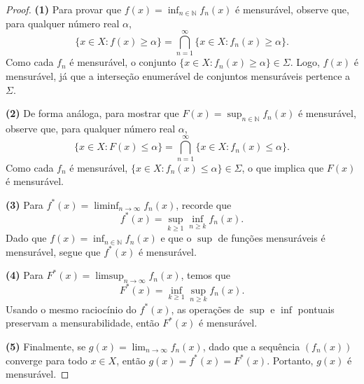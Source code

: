 \begin{proof}
    \textbf{(1)} Para provar que $ f(x) = \inf_{n \in \mathbb{N}} f_n(x) $ é mensurável, observe que, para qualquer número real $\alpha$,
    \begin{equation*}
    \{ x \in X : f(x) \geq \alpha \} = \bigcap_{n=1}^{\infty} \{ x \in X : f_n(x) \geq \alpha \}.
    \end{equation*}
    Como cada $ f_n $ é mensurável, o conjunto $ \{ x \in X : f_n(x) \geq \alpha \} \in \Sigma $. Logo, $ f(x) $ é mensurável, já que a interseção enumerável de conjuntos mensuráveis pertence a $\Sigma$.

    \textbf{(2)} De forma análoga, para mostrar que $ F(x) = \sup_{n \in \mathbb{N}} f_n(x) $ é mensurável, observe que, para qualquer número real $\alpha$,
    \begin{equation*}
    \{ x \in X : F(x) \leq \alpha \} = \bigcap_{n=1}^{\infty} \{ x \in X : f_n(x) \leq \alpha \}.
    \end{equation*}
    Como cada $ f_n $ é mensurável, $ \{ x \in X : f_n(x) \leq \alpha \} \in \Sigma $, o que implica que $ F(x) $ é mensurável.

    \textbf{(3)} Para $ f^{*}(x) = \liminf_{n \to \infty} f_n(x) $, recorde que
    \begin{equation*}
    f^{*}(x) = \sup_{k \geq 1} \inf_{n \geq k} f_n(x).
    \end{equation*}
    Dado que $ f(x) = \inf_{n \in \mathbb{N}} f_n(x) $ e que o $ \sup $ de funções mensuráveis é mensurável, segue que $ f^{*}(x) $ é mensurável.

    \textbf{(4)} Para $ F^{*}(x) = \limsup_{n \to \infty} f_n(x) $, temos que
    \begin{equation*}
    F^{*}(x) = \inf_{k \geq 1} \sup_{n \geq k} f_n(x).
    \end{equation*}
    Usando o mesmo raciocínio do $ f^{*}(x) $, as operações de $ \sup $ e $ \inf $ pontuais preservam a mensurabilidade, então $ F^{*}(x) $ é mensurável.

    \textbf{(5)} Finalmente, se $ g(x) = \lim_{n \to \infty} f_n(x) $, dado que a sequência $ (f_n(x)) $ converge para todo $x \in X$, então $ g(x)=f^{*}(x)=F^{*}(x) $. Portanto, $ g(x) $ é mensurável.
\end{proof}
